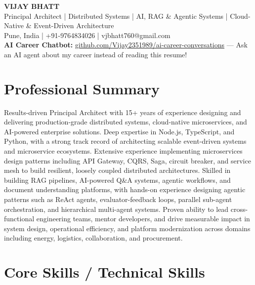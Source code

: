 \documentclass[a4paper,11pt]{article}
\begin{document}
\begin{center}
  {\LARGE\bfseries VIJAY BHATT} \\[6pt]
  {\large Principal Architect | Distributed Systems | AI, RAG \& Agentic Systems | Cloud-Native \& Event-Driven Architecture} \\[4pt]
  {Pune, India | +91-9764834026 | vjbhatt760@gmail.com} \\[4pt]
  {\small \textcolor{accent}{\textbf{AI Career Chatbot:}} \href{https://github.com/Vijay2351989/ai-career-conversations}{github.com/Vijay2351989/ai-career-conversations} --- Ask an AI agent about my career instead of reading this resume!}
\end{center}

\section{Professional Summary}
Results-driven Principal Architect with 15+ years of experience designing and delivering production-grade distributed systems, cloud-native microservices, and AI-powered enterprise solutions. Deep expertise in Node.js, TypeScript, and Python, with a strong track record of architecting scalable event-driven systems and microservice ecosystems. Extensive experience implementing microservices design patterns including API Gateway, CQRS, Saga, circuit breaker, and service mesh to build resilient, loosely coupled distributed architectures. Skilled in building RAG pipelines, AI-powered Q\&A systems, agentic workflows, and document understanding platforms, with hands-on experience designing agentic patterns such as ReAct agents, evaluator-feedback loops, parallel sub-agent orchestration, and hierarchical multi-agent systems. Proven ability to lead cross-functional engineering teams, mentor developers, and drive measurable impact in system design, operational efficiency, and platform modernization across domains including energy, logistics, collaboration, and procurement.

\section{Core Skills / Technical Skills}
\end{document}
